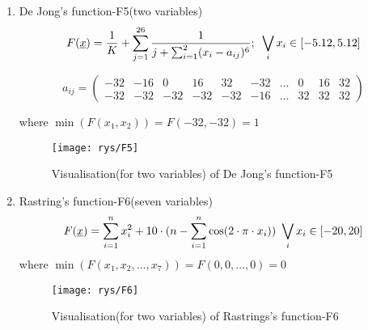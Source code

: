 \begin{enumerate}
\item De Jong's function-F5(two variables)
	\begin{equation}
		F(\underline{x})=\frac{1}{K}+\sum_{j=1}^{26}\frac{1}{j+\sum_{i=1}^2(x_i-a_{ij})^6}; \textnormal{  }
		\bigvee_i x_i \in [-5.12,5.12]
		\label{dj5}
	\end{equation}
	\begin{small}	
	\[a_{ij}=\left ( \begin{array}{cccccccccc}
  -32& -16& 0& 16& 32& -32& \ldots & 0& 16& 32\\
  -32& -32& -32& -32& -32& -16& \ldots& 32& 32& 32
		\end{array} \right )\]
	\end{small}
	where $\min(F(x_1, x_2))=F(-32,-32)=1$
	\pagebreak
	\begin{figure}[!htpb]
		\begin{center}
			\texttt{[image: rys/F5]}
		\end{center}
		\caption{Visualisation(for two variables) of De Jong's function-F5}
		\label{fig:F4}
	\end{figure}

\item Rastring's function-F6(seven variables)
	\begin{equation}
		F(\underline{x})=\sum_{i=1}^nx_i^2+ 10\cdot
		(n-\sum_{i=1}^{n}\cos(2\cdot\pi\cdot x_i)) \textnormal{
		} \bigvee_i x_i \in [-20, 20]
		\label{r5}
	\end{equation}
	where $\min(F(x_1, x_2, \ldots, x_7))=F(0,0,\ldots, 0)=0$
	\nopagebreak
	\begin{figure}[!htpb]
		\begin{center}
			\texttt{[image: rys/F6]}
		\end{center}
		\caption{Visualisation(for two variables) of Rastrings's function-F6}
		\label{fig:F5}
	\end{figure}
\end{enumerate}
